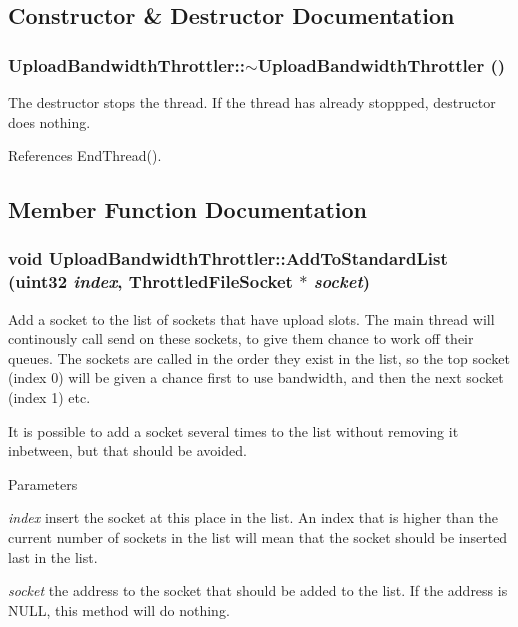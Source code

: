 \subsection{Constructor \& Destructor Documentation}
\subsubsection[{$\sim$UploadBandwidthThrottler}]{\setlength{\rightskip}{0pt plus 5cm}UploadBandwidthThrottler::$\sim$UploadBandwidthThrottler ()}\label{classUploadBandwidthThrottler_aa1793f5950342873537b1c95a76e87f1}


The destructor stops the thread. If the thread has already stoppped, destructor does nothing. 

References EndThread().

\subsection{Member Function Documentation}
\subsubsection[{AddToStandardList}]{\setlength{\rightskip}{0pt plus 5cm}void UploadBandwidthThrottler::AddToStandardList (uint32 {\em index}, \/  {\bf ThrottledFileSocket} $\ast$ {\em socket})}\label{classUploadBandwidthThrottler_a4543817d0ffdf9160e5bfebd39253f96}


Add a socket to the list of sockets that have upload slots. The main thread will continously call send on these sockets, to give them chance to work off their queues. The sockets are called in the order they exist in the list, so the top socket (index 0) will be given a chance first to use bandwidth, and then the next socket (index 1) etc.

It is possible to add a socket several times to the list without removing it inbetween, but that should be avoided.


\begin{DoxyParams}{Parameters}
\item[{\em index}]insert the socket at this place in the list. An index that is higher than the current number of sockets in the list will mean that the socket should be inserted last in the list.\item[{\em socket}]the address to the socket that should be added to the list. If the address is NULL, this method will do nothing. \end{DoxyParams}


